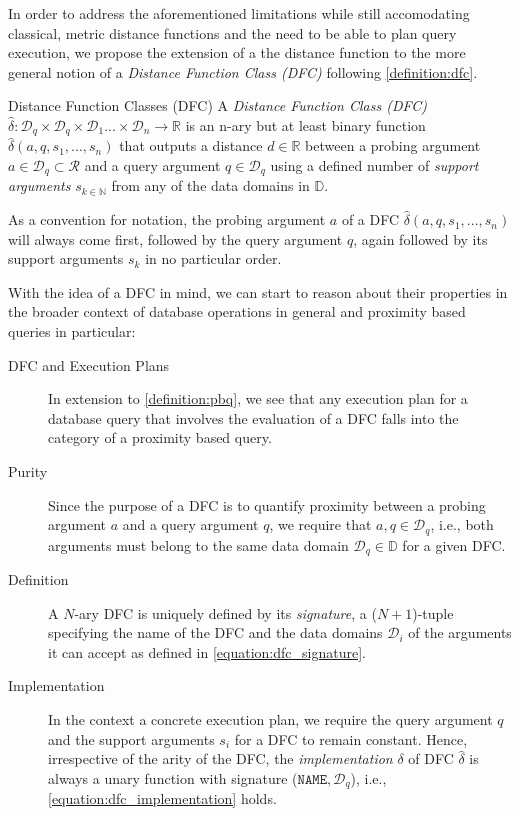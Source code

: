 In order to address the aforementioned limitations while still accomodating classical, metric distance functions and the need to be able to plan query execution, we propose the extension of a the distance function to the more general notion of a \emph{Distance Function Class (DFC)} following \cref{definition:dfc}.

\begin{definition}[label=definition:dfc]{Distance Function Classes (DFC)}{}
    A \emph{Distance Function Class (DFC)} $\hat{\delta} \colon \mathcal{D}_q \times \mathcal{D}_q \times \mathcal{D}_{1} ... \times \mathcal{D}_{n} \to \mathbb{R}$ is an n-ary but at least binary function $\hat{\delta}(a,q,s_1,...,s_n)$ that outputs a distance $d \in \mathbb{R}$ between a probing argument $a \in \mathcal{D}_q \subset \mathcal{R}$ and a query argument $q \in \mathcal{D}_q$ using a defined number of \emph{support arguments} $s_{k \in \mathbb{N}}$ from any of the data domains in $\mathbb{D}$.
\end{definition}

As a convention for notation, the probing argument $a$ of a DFC $\hat{\delta}(a,q,s_1,...,s_n)$ will always come first, followed by the query argument $q$, again followed by its support arguments $s_k$ in no particular order. 

With the idea of a DFC in mind, we can start to reason about their properties in the broader context of database operations in general and proximity based queries in particular:

\begin{description}

    \item[DFC and Execution Plans] In extension to \cref{definition:pbq}, we see that any execution plan for a database query that involves the evaluation of a DFC falls into the category of a proximity based query.

    \item[Purity] Since the purpose of a DFC is to quantify proximity between a probing argument $a$ and a query argument $q$, we require that $a, q \in \mathcal{D}_q$, i.e., both arguments must belong to the same data domain $\mathcal{D}_q \in \mathbb{D}$ for a given DFC.

    \item[Definition] A $N$-ary DFC is uniquely defined by its \emph{signature}, a ($N+1$)-tuple specifying the name of the DFC and the data domains $\mathcal{D}_i$ of the arguments it can accept as defined in \cref{equation:dfc_signature}. 

    \item[Implementation] In the context a concrete execution plan, we require the query argument $q$ and the support arguments $s_i$ for a DFC to remain constant. Hence, irrespective of the arity of the DFC, the \emph{implementation} $\delta$ of DFC $\hat{\delta}$ is always a unary function with signature ($\mathtt{NAME}, \mathcal{D}_q$), i.e., \cref{equation:dfc_implementation} holds.
\end{description}


